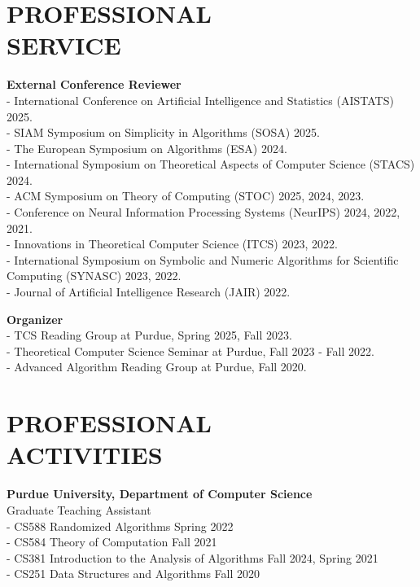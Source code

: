 \documentclass[margin, 10pt]{res} %
\begin{document}
\begin{resume}
\section{PROFESSIONAL \\ SERVICE}

{\bf External Conference Reviewer}\\
\hphantom{12}- International Conference on Artificial Intelligence and Statistics (AISTATS) 2025.\\
\hphantom{12}- SIAM Symposium on Simplicity in Algorithms (SOSA) 2025.\\
\hphantom{12}- The European Symposium on Algorithms (ESA) 2024.\\
\hphantom{12}- International Symposium on Theoretical Aspects of Computer Science (STACS) \hphantom{1234} 2024.\\
\hphantom{12}- ACM Symposium on Theory of Computing (STOC) 2025, 2024, 2023.\\
\hphantom{12}- Conference on Neural Information Processing Systems (NeurIPS) 2024, 2022, \hphantom{1234} 2021.\\
\hphantom{12}- Innovations in Theoretical Computer Science (ITCS) 2023, 2022.\\
\hphantom{12}- International Symposium on Symbolic and Numeric Algorithms for Scientific\\ \hphantom{1234} Computing (SYNASC) 2023, 2022.\\
\hphantom{12}- Journal of Artificial Intelligence Research (JAIR) 2022.

{\bf Organizer}\\
\hphantom{12}- TCS Reading Group at Purdue, Spring 2025, Fall 2023.\\
\hphantom{12}- Theoretical Computer Science Seminar at Purdue, Fall 2023 - Fall 2022.\\
\hphantom{12}- Advanced Algorithm Reading Group at Purdue, Fall 2020.


\section{PROFESSIONAL \\ ACTIVITIES}

{\bf Purdue University, Department of Computer Science}\\
Graduate Teaching Assistant\\
\hphantom{12}- CS588 Randomized Algorithms \hfill Spring 2022\\
\hphantom{12}- CS584 Theory of Computation \hfill Fall 2021\\
\hphantom{12}- CS381 Introduction to the Analysis of Algorithms \hfill Fall 2024, Spring 2021\\
\hphantom{12}- CS251 Data Structures and Algorithms \hfill Fall 2020



\end{resume}
\end{document}
